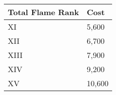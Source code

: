 \begin{minipage}{0.30\textwidth}
    \begin{tabular}{l | l}
        Total Flame Rank & Cost\\ \hline
        XI & 5,600\\
        XII & 6,700\\
        XIII & 7,900\\
        XIV & 9,200\\
        XV & 10,600\\
    \end{tabular}
\end{minipage}









